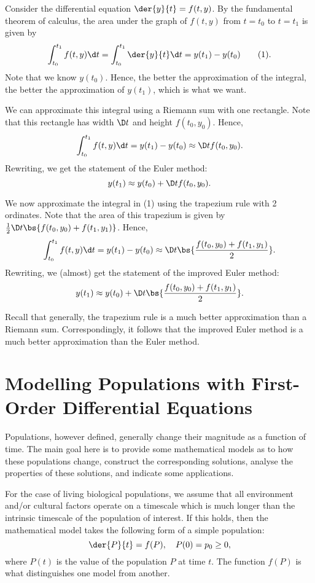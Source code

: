 Consider the differential equation $\der{y}{t} = f(t, y)$. By the fundamental theorem of calculus, the area under the graph of $f(t, y)$ from $t = t_0$ to $t = t_1$ is given by \[\int_{t_0}^{t_1} f(t, y) \d t = \int_{t_0}^{t_1} \der{y}{t} \d t = y(t_1) - y(t_0) \tag{1}.\] Note that we know $y(t_0)$. Hence, the better the approximation of the integral, the better the approximation of $y(t_1)$, which is what we want.

We can approximate this integral using a Riemann sum with one rectangle. Note that this rectangle has width $\D t$ and height $f(t_0, y_0)$. Hence, \[\int_{t_0}^{t_1} f(t, y) \d t = y(t_1) - y(t_0) \approx \D t f(t_0, y_0).\] Rewriting, we get the statement of the Euler method: \[y(t_1) \approx y(t_0) + \D t f(t_0, y_0).\]

We now approximate the integral in (1) using the trapezium rule with 2 ordinates. Note that the area of this trapezium is given by $\frac12 \D t \bs{f(t_0, y_0) + f(t_1, y_1)}$. Hence, \[\int_{t_0}^{t_1} f(t, y) \d t = y(t_1) - y(t_0) \approx \D t \bs{\frac{f(t_0, y_0) +f(t_1, y_1)}{2}}.\] Rewriting, we (almost) get the statement of the improved Euler method: \[y(t_1) \approx y(t_0) + \D t \bs{\frac{f(t_0, y_0) +f(t_1, y_1)}{2}}.\]

Recall that generally, the trapezium rule is a much better approximation than a Riemann sum. Correspondingly, it follows that the improved Euler method is a much better approximation than the Euler method.

\section{Modelling Populations with First-Order Differential Equations}

Populations, however defined, generally change their magnitude as a function of time. The main goal here is to provide some mathematical models as to how these populations change, construct the corresponding solutions, analyse the properties of these solutions, and indicate some applications.

For the case of living biological populations, we assume that all environment and/or cultural factors operate on a timescale which is much longer than the intrinsic timescale of the population of interest. If this holds, then the mathematical model takes the following form of a simple population: \[\der{P}{t} = f(P), \quad P(0) = p_0 \geq 0,\] where $P(t)$ is the value of the population $P$ at time $t$. The function $f(P)$ is what distinguishes one model from another.


